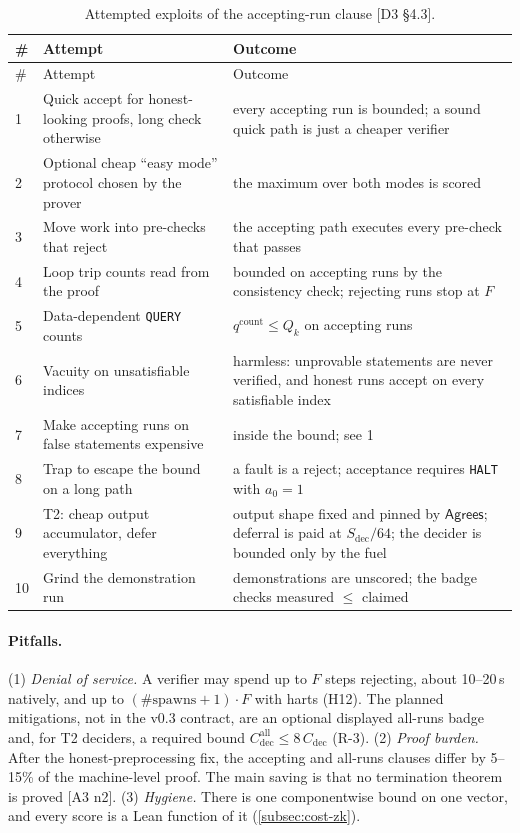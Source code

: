 \begingroup\small
\renewcommand{\arraystretch}{1.1}
\begin{longtable}{@{}p{}>{\raggedright\arraybackslash}p{}>{\raggedright\arraybackslash}p{}@{}}
\caption{Attempted exploits of the accepting-run clause [D3 §4.3].}\label{tab:cost-u2-exploits}\\
\toprule
\# & Attempt & Outcome \\
\midrule
\endfirsthead
\toprule
\# & Attempt & Outcome \\
\midrule
\endhead
1 & Quick accept for honest-looking proofs, long check otherwise & every accepting run is bounded; a sound quick path is just a cheaper verifier \\
2 & Optional cheap \enquote{easy mode} protocol chosen by the prover & the maximum over both modes is scored \\
3 & Move work into pre-checks that reject & the accepting path executes every pre-check that passes \\
4 & Loop trip counts read from the proof & bounded on accepting runs by the consistency check; rejecting runs stop at $F$ \\
5 & Data-dependent \texttt{QUERY} counts & $q^{\mathrm{count}}\le Q_k$ on accepting runs \\
6 & Vacuity on unsatisfiable indices & harmless: unprovable statements are never verified, and honest runs accept on every satisfiable index \\
7 & Make accepting runs on false statements expensive & inside the bound; see 1 \\
8 & Trap to escape the bound on a long path & a fault is a reject; acceptance requires \texttt{HALT} with $a_0=1$ \\
9 & T2: cheap output accumulator, defer everything & output shape fixed and pinned by $\mathsf{Agrees}$; deferral is paid at $S_{\mathrm{dec}}/64$; the decider is bounded only by the fuel \\
10 & Grind the demonstration run & demonstrations are unscored; the badge checks measured $\le$ claimed \\
\bottomrule
\end{longtable}
\endgroup

\paragraph{Pitfalls.} (1) \emph{Denial of service.} A verifier may spend up to $F$ steps rejecting,
about 10--20\,s natively, and up to $(\#\mathrm{spawns}+1)\cdot F$ with harts (H12). The planned
mitigations, not in the v0.3 contract, are an optional displayed all-runs badge and, for T2
deciders, a required bound $C^{\mathrm{all}}_{\mathrm{dec}}\le8\,C_{\mathrm{dec}}$ (R-3).
(2) \emph{Proof burden.} After the honest-preprocessing fix, the
accepting and all-runs clauses differ by 5--15\% of the machine-level proof. The main saving is that no
termination theorem is proved [A3 n2]. (3) \emph{Hygiene.} There is one componentwise bound on one
vector, and every score is a Lean function of it (\cref{subsec:cost-zk}).

